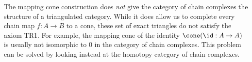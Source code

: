 

The mapping cone construction does \emph{not} give the category of chain complexes the structure of a triangulated category. While it does allow us to complete every chain map $f: A\to B$ to a cone, these set of exact triangles do not satisfy the axiom TR1. For example, the mapping cone of the identity $\cone(\id: A\to A)$ is usually not isomorphic to $0$ in the category of chain complexes. This problem can be solved by looking instead at the homotopy category of chain complexes.